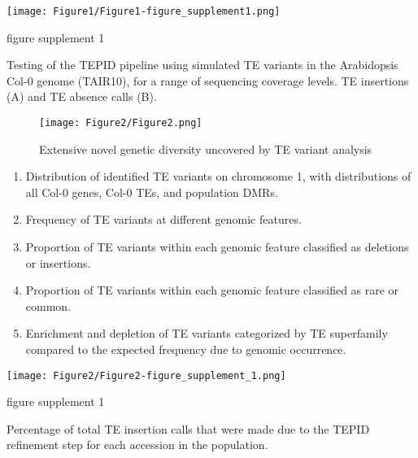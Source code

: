 \documentclass[12pt]{article}
\begin{document}
\pagebreak



\begin{suppfigure}[h]
  \centering
  \texttt{[image: Figure1/Figure1-figure\_supplement1.png]}
  \caption{figure supplement 1}
  \label{fig1s1}
\end{suppfigure}

Testing of the TEPID pipeline using simulated TE variants in the
Arabidopsis Col-0 genome (TAIR10), for a range of sequencing coverage
levels. TE insertions (A) and TE absence calls (B).

\pagebreak



\begin{figure}[h]
  \centering
  \texttt{[image: Figure2/Figure2.png]}
  \caption{Extensive novel genetic diversity uncovered by TE variant analysis}
  \label{fig2}
\end{figure}


\begin{enumerate}
\def\labelenumi{(\Alph{enumi})}
\item
  Distribution of identified TE variants on chromosome 1, with
  distributions of all Col-0 genes, Col-0 TEs, and population DMRs.
\item
  Frequency of TE variants at different genomic features.
\item
  Proportion of TE variants within each genomic feature classified as
  deletions or insertions.
\item
  Proportion of TE variants within each genomic feature classified as
  rare or common.
\item
  Enrichment and depletion of TE variants categorized by TE superfamily
  compared to the expected frequency due to genomic occurrence.
\end{enumerate}

\pagebreak


\setcounter{suppfigure}{1}
\begin{suppfigure}
  \centering
  \texttt{[image: Figure2/Figure2-figure\_supplement\_1.png]}
  \caption{figure supplement 1}
  \label{fig2s1}
\end{suppfigure}

Percentage of total TE insertion calls that were made due to the TEPID
refinement step for each accession in the population.
\end{document}
